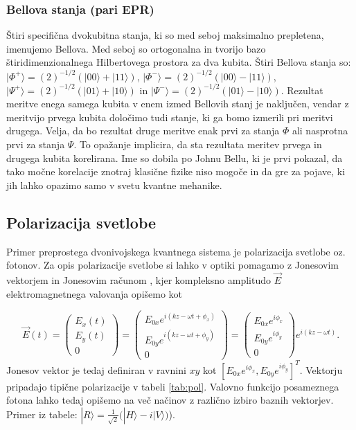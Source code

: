 \documentclass[12pt]{article}
\begin{document}
\subsubsection{Bellova stanja (pari EPR)}
Štiri specifična dvokubitna stanja, ki so med seboj maksimalno prepletena, imenujemo Bellova. Med seboj so ortogonalna in tvorijo bazo štiridimenzionalnega Hilbertovega prostora za dva kubita. Štiri Bellova stanja so: $|\Phi ^{+}\rangle = {\displaystyle { {(2)^{-1/2}(|00\rangle +|11\rangle )}}} $, $|\Phi ^{-}\rangle = {\displaystyle { {(2)^{-1/2}(|00\rangle -|11\rangle )}}}$, $|\Psi ^{+}\rangle = {\displaystyle { {(2)^{-1/2}(|01\rangle +|10\rangle )}}}$ in $|\Psi ^{-}\rangle = {\displaystyle { {(2)^{-1/2}(|01\rangle -|10\rangle )}}}$. Rezultat meritve enega samega kubita v enem izmed Bellovih stanj je naključen, vendar z meritvijo prvega kubita določimo tudi stanje, ki ga bomo izmerili pri meritvi drugega. Velja, da bo rezultat druge meritve enak prvi za stanja $\Phi$ ali nasprotna prvi za stanja $\Psi$. To opažanje implicira, da sta rezultata meritev prvega in drugega kubita korelirana. Ime so dobila po Johnu Bellu, ki je prvi pokazal, da tako močne korelacije znotraj klasične fizike niso mogoče in da gre za pojave, ki jih lahko opazimo samo v svetu kvantne mehanike. \cite{BellState2023}


\subsection{Polarizacija svetlobe}

Primer preprostega dvonivojskega kvantnega sistema je polarizacija svetlobe oz. fotonov. Za opis polarizacije svetlobe si lahko v optiki pomagamo z Jonesovim vektorjem in Jonesovim računom \cite{JonesCalculus2023}, kjer kompleksno amplitudo $\vec{E}$ elektromagnetnega valovanja opišemo kot

\begin{equation}
{\displaystyle \vec{E}(t) = {\begin{pmatrix}E_{x}(t)\\E_{y}(t)\\0\end{pmatrix}}={\begin{pmatrix}E_{0x}e^{i(kz-\omega t+\phi _{x})}\\E_{0y}e^{i(kz-\omega t+\phi _{y})}\\0\end{pmatrix}}={\begin{pmatrix}E_{0x}e^{i\phi _{x}}\\E_{0y}e^{i\phi _{y}}\\0\end{pmatrix}}e^{i(kz-\omega t)}.}
\end{equation}  
Jonesov vektor je tedaj definiran v ravnini $xy$ kot $ [ E_{0x}e^{i\phi _{x}}, E_{0y}e^{i\phi _{y}}]^T$. Vektorju pripadajo tipične polarizacije v tabeli \ref{tab:pol}. Valovno funkcijo posameznega fotona lahko tedaj opišemo na več načinov z različno izbiro baznih vektorjev. Primer iz tabele: $ { |R\rangle ={\frac {1}{\sqrt {2}}}{\big (}|H\rangle -i|V\rangle {\big )}} $). 
\end{document}
